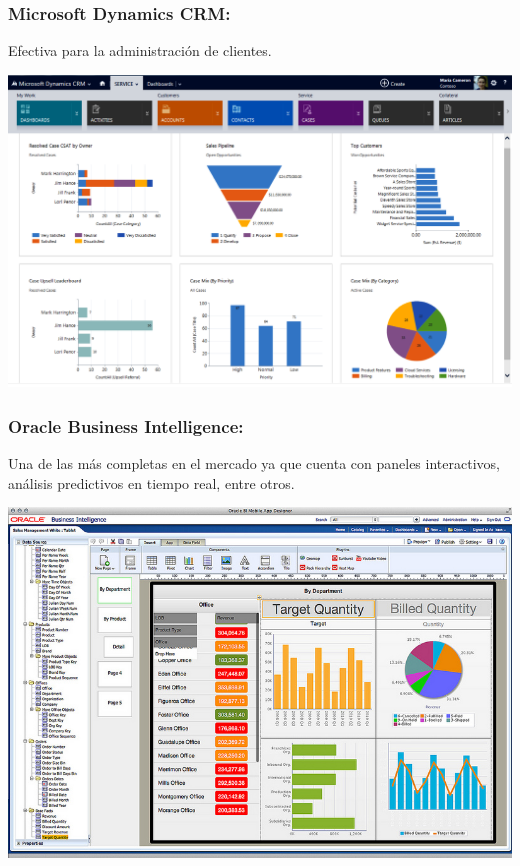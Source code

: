 \subsubsection{Microsoft Dynamics CRM: }\label{sec:nada2}  
Efectiva para la administración de clientes.
	\begin{center}
	\includegraphics[width=15cm]{./Imagenes/BIimagen2}
	\end{center}
	
\subsubsection{Oracle Business Intelligence: }\label{sec:nada2} 
Una de las más completas en el mercado ya que cuenta con paneles interactivos, análisis predictivos en tiempo real, entre otros.
	\begin{center}
	\includegraphics[width=15cm]{./Imagenes/BIimagen3}
	\end{center}
	
